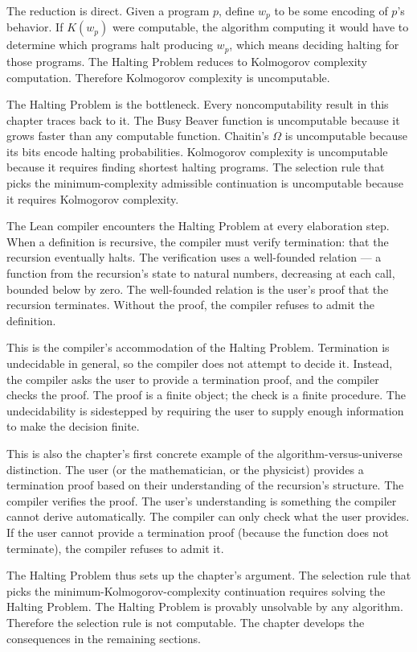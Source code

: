 The reduction is direct. Given a program $p$, define $w_p$ to be
some encoding of $p$'s behavior. If $K(w_p)$ were computable, the
algorithm computing it would have to determine which programs halt
producing $w_p$, which means deciding halting for those programs.
The Halting Problem reduces to Kolmogorov complexity computation.
Therefore Kolmogorov complexity is uncomputable.

The Halting Problem is the bottleneck. Every noncomputability
result in this chapter traces back to it. The Busy Beaver function
is uncomputable because it grows faster than any computable
function. Chaitin's $\Omega$ is uncomputable because its bits
encode halting probabilities. Kolmogorov complexity is uncomputable
because it requires finding shortest halting programs. The
selection rule that picks the minimum-complexity admissible
continuation is uncomputable because it requires Kolmogorov
complexity.

The Lean compiler encounters the Halting Problem at every
elaboration step. When a definition is recursive, the compiler must
verify termination: that the recursion eventually halts. The
verification uses a well-founded relation --- a function from the
recursion's state to natural numbers, decreasing at each call,
bounded below by zero. The well-founded relation is the user's
proof that the recursion terminates. Without the proof, the
compiler refuses to admit the definition.

This is the compiler's accommodation of the Halting Problem.
Termination is undecidable in general, so the compiler does not
attempt to decide it. Instead, the compiler asks the user to
provide a termination proof, and the compiler checks the proof. The
proof is a finite object; the check is a finite procedure. The
undecidability is sidestepped by requiring the user to supply
enough information to make the decision finite.

This is also the chapter's first concrete example of the
algorithm-versus-universe distinction. The user (or the
mathematician, or the physicist) provides a termination proof
based on their understanding of the recursion's structure. The
compiler verifies the proof. The user's understanding is something
the compiler cannot derive automatically. The compiler can only
check what the user provides. If the user cannot provide a
termination proof (because the function does not terminate), the
compiler refuses to admit it.

The Halting Problem thus sets up the chapter's argument. The
selection rule that picks the minimum-Kolmogorov-complexity
continuation requires solving the Halting Problem. The Halting
Problem is provably unsolvable by any algorithm. Therefore the
selection rule is not computable. The chapter develops the
consequences in the remaining sections.

